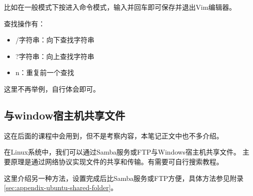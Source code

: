 比如在一般模式下按\code{:}进入命令模式，输入并回车即可保存并退出Vim编辑器。

查找操作有：
\begin{itemize}
\item /字符串：向下查找字符串
\item ?字符串：向上查找字符串
\item n：重复前一个查找
\end{itemize}

这里不再举例，自行体会即可。


\subsection{与window宿主机共享文件}
这在后面的课程中会用到，但不是考察内容，本笔记正文中也不多介绍。

在Linux系统中，我们可以通过Samba服务或FTP与Windows宿主机共享文件。
主要原理是通过网络协议实现文件的共享和传输。有需要可自行搜索教程。

这里介绍另一种方法，设置完成后比Samba服务或FTP方便，具体方法参见附录\ref{sec:appendix-ubuntu-shared-folder}。
